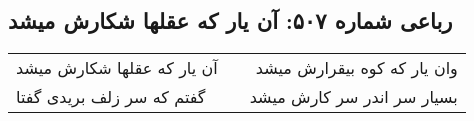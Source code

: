 \begin{center}
\section*{رباعی شماره ۵۰۷: آن یار که عقلها شکارش میشد}
\label{sec:0507}
\begin{longtable}{l p{0.5cm} r}
آن یار که عقلها شکارش میشد
&&
وان یار که کوه بیقرارش میشد
\\
گفتم که سر زلف بریدی گفتا
&&
بسیار سر اندر سر کارش میشد
\\
\end{longtable}
\end{center}
